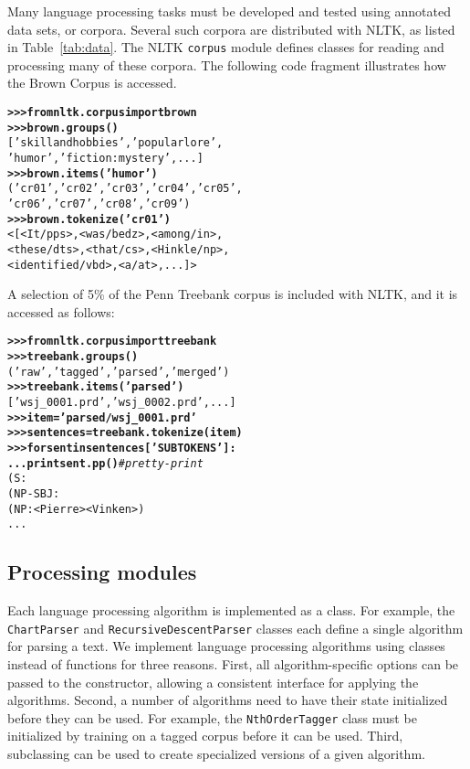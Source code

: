 \documentclass[11pt]{article}
\def\object#1{\texttt{\small #1}}
\begin{document}
Many language processing tasks must be developed and tested using
annotated data sets, or corpora.  Several such corpora are distributed
with NLTK, as listed in Table~\ref{tab:data}.  The NLTK
\object{corpus} module defines classes for reading and processing
many of these corpora.  The following code fragment illustrates
how the Brown Corpus is accessed.

\begin{alltt}\small
\textbf{>>> from nltk.corpus import brown}
\textbf{>>> brown.groups()}
['skill and hobbies', 'popular lore', 
'humor', 'fiction: mystery', ...]
\textbf{>>> brown.items('humor')}
('cr01', 'cr02', 'cr03', 'cr04', 'cr05',
'cr06', 'cr07', 'cr08', 'cr09')
\textbf{>>> brown.tokenize('cr01')}
<[<It/pps>, <was/bedz>, <among/in>,
<these/dts>, <that/cs>, <Hinkle/np>,
<identified/vbd>, <a/at>, ...]>
\end{alltt}
%
A selection of 5\% of the Penn Treebank corpus is included with
NLTK, and it is accessed as follows:

\begin{alltt}\small
\textbf{>>> from nltk.corpus import treebank}
\textbf{>>> treebank.groups()}
('raw', 'tagged', 'parsed', 'merged')
\textbf{>>> treebank.items('parsed')}
['wsj_0001.prd', 'wsj_0002.prd', ...]
\textbf{>>> item = 'parsed/wsj_0001.prd'}
\textbf{>>> sentences = treebank.tokenize(item)}
\textbf{>>> for sent in sentences['SUBTOKENS']:}
\textbf{...     print sent.pp()} \emph{# pretty-print}
(S:
  (NP-SBJ:
    (NP: <Pierre> <Vinken>)
    ...
\end{alltt}
%

\subsection{Processing modules}

Each language processing algorithm is implemented as a class.  For
example, the \object{ChartParser} and
\object{Recursive\-Descent\-Parser} classes each define a single
algorithm for parsing a text.  We implement language processing
algorithms using classes instead of functions for three reasons.
First, all algorithm-specific options can be passed to the
constructor, allowing a consistent interface for applying the
algorithms.  Second, a number of algorithms need to have their state
initialized before they can be used.  For example, the
\object{NthOrderTagger} class must be initialized by training on a
tagged corpus before it can be used.  Third, subclassing can be used
to create specialized versions of a given algorithm.
\end{document}
